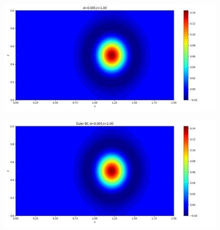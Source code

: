 \documentclass[12pt]{article}
\begin{document}
\begin{figure}[H]
\begin{minipage}{\linewidth}
\begin{minipage}{0.5\textwidth}
\includegraphics[width=\linewidth]{figures/3d0.005t1.00.png}
\label{fig5}
\end{minipage}\hfill
\begin{minipage}{0.5\textwidth}
\includegraphics[width=\linewidth]{figures/3Ed0.005t1.00.png}
\label{fig6}
\end{minipage}
\vspace{-1.5em}


\end{minipage}
\end{figure}
\end{document}
